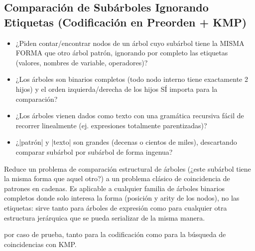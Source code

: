 \subsection{Comparación de Subárboles Ignorando Etiquetas (Codificación en Preorden + KMP)}


\begin{itemize}
\item ¿Piden contar/encontrar nodos de un árbol cuyo subárbol tiene la MISMA FORMA que otro árbol patrón, ignorando por completo las etiquetas (valores, nombres de variable, operadores)?
\item ¿Los árboles son binarios completos (todo nodo interno tiene exactamente 2 hijos) y el orden izquierda/derecha de los hijos SÍ importa para la comparación?
\item ¿Los árboles vienen dados como texto con una gramática recursiva fácil de recorrer linealmente (ej. expresiones totalmente parentizadas)?
\item ¿|patrón| y |texto| son grandes (decenas o cientos de miles), descartando comparar subárbol por subárbol de forma ingenua?
\end{itemize}

 Reduce un problema de comparación estructural de árboles (¿este subárbol tiene la misma forma que aquel otro?) a un problema clásico de coincidencia de patrones en cadenas. Es aplicable a cualquier familia de árboles binarios completos donde solo interesa la forma (posición y arity de los nodos), no las etiquetas: sirve tanto para árboles de expresión como para cualquier otra estructura jerárquica que se pueda serializar de la misma manera.

 \bigO{|\alpha| + |\beta|} por caso de prueba, tanto para la codificación como para la búsqueda de coincidencias con KMP.

